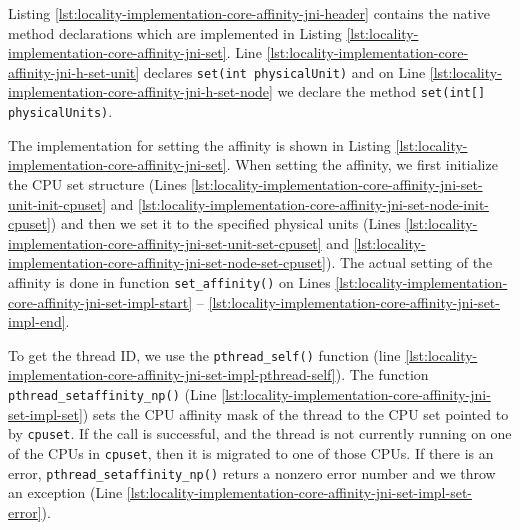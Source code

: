 

Listing \ref{lst:locality-implementation-core-affinity-jni-header}
contains the native method declarations which are implemented in
Listing \ref{lst:locality-implementation-core-affinity-jni-set}. Line
\ref{lst:locality-implementation-core-affinity-jni-h-set-unit}
declares \lstinline!set(int physicalUnit)! and on Line
\ref{lst:locality-implementation-core-affinity-jni-h-set-node} we
declare the method \lstinline!set(int[] physicalUnits)!.





The implementation for setting the affinity is shown in Listing
\ref{lst:locality-implementation-core-affinity-jni-set}. When setting
the affinity, we first initialize the CPU set structure (Lines
\ref{lst:locality-implementation-core-affinity-jni-set-unit-init-cpuset}
and
\ref{lst:locality-implementation-core-affinity-jni-set-node-init-cpuset})
and then we set it to the specified physical units (Lines
\ref{lst:locality-implementation-core-affinity-jni-set-unit-set-cpuset}
and
\ref{lst:locality-implementation-core-affinity-jni-set-node-set-cpuset}). The
actual setting of the affinity is done in function
\lstinline!set_affinity()! on Lines
\ref{lst:locality-implementation-core-affinity-jni-set-impl-start} --
\ref{lst:locality-implementation-core-affinity-jni-set-impl-end}.

To get the thread ID, we use the \lstinline!pthread_self()! function
(line
\ref{lst:locality-implementation-core-affinity-jni-set-impl-pthread-self}). The
function \lstinline!pthread_setaffinity_np()! (Line
\ref{lst:locality-implementation-core-affinity-jni-set-impl-set}) sets
the CPU affinity mask of the thread to the CPU set pointed to by
\lstinline!cpuset!.  If the call is successful, and the thread is not
currently running on one of the CPUs in \lstinline!cpuset!, then it is
migrated to one of those CPUs. If there is an error,
\lstinline!pthread_setaffinity_np()!  returs a nonzero error number
and we throw an exception (Line
\ref{lst:locality-implementation-core-affinity-jni-set-impl-set-error}).


